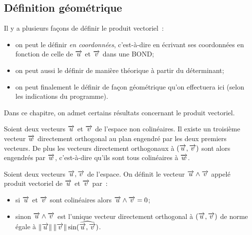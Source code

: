 \subsection{Définition géométrique}
Il y a plusieurs façons de définir le produit vectoriel~:
\begin{itemize}
\item on peut le définir \emph{en coordonnées}, c'est-à-dire en écrivant ses coordonnées en fonction de celle de $\overrightarrow{u}$ et $\overrightarrow{v}$ dans une BOND;
\item on peut aussi le définir de manière théorique à partir du déterminant;
\item on peut finalement le définir de façon géométrique qu'on effectuera ici (selon les indications du programme).
\end{itemize}
Dans ce chapitre, on admet certains résultats concernant le produit vectoriel.
\begin{prop}[admise]
 Soient deux vecteurs $\overrightarrow{u}$ et $\overrightarrow{v}$ de l'espace non colinéaires. Il existe un troisième vecteur $\overrightarrow{w}$ directement orthogonal au plan engendré par les deux premiers vecteurs. De plus les vecteurs directement orthogonaux à $(\overrightarrow{u},\overrightarrow{v})$ sont alors engendrés par $\overrightarrow{w}$, c'est-à-dire qu'ils sont tous colinéaires à $\overrightarrow{w}$.
\end{prop}
\begin{defdef}
  Soient deux vecteurs $\overrightarrow{u}, \overrightarrow{v}$ de l'espace. On définit le vecteur $\overrightarrow{u} \wedge \overrightarrow{v}$ appelé produit vectoriel de $\overrightarrow{u}$ et $\overrightarrow{v}$ par~:
  \begin{itemize}
  \item si $\overrightarrow{u}$ et $\overrightarrow{v}$  sont colinéaires alors $\overrightarrow{u} \wedge \overrightarrow{v}=0$;
  \item sinon $\overrightarrow{u} \wedge \overrightarrow{v}$ est l'unique vecteur directement orthogonal à $(\overrightarrow{u},\overrightarrow{v})$ de norme égale à $\left\lVert\overrightarrow{u}\right\rVert\left\lVert\overrightarrow{v}\right\rVert\sin(\widehat{\overrightarrow{u},\overrightarrow{v}})$.
  \end{itemize}
\end{defdef}

